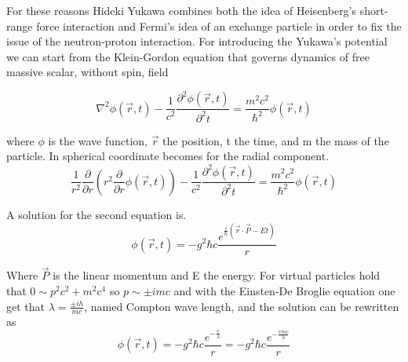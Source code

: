 \documentclass[12pt,a4paper]{book}
\begin{document}
	For these reasons Hideki Yukawa combines both the idea of Heisenberg's short-range force interaction and Fermi's idea of an exchange particle in order to fix the issue of the neutron-proton interaction. For introducing the Yukawa's potential we can start from the Klein-Gordon equation that governs dynamics of free massive scalar, without spin, field
	
	\begin{equation}
		\nabla^2 \phi(\vec{r},t) - \frac{1}{c^2} \frac{\partial^2 \phi(\vec{r},t)}{\partial^2 t} = \frac{m^2 c^2}{\hbar^2} \phi(\vec{r},t)
		\label{eq:klein-gordon}
	\end{equation}
	
	where $\phi$ is the wave function, $\vec{r}$ the position, t the time, and m the mass of the particle. In spherical coordinate becomes for the radial component.
	\begin{equation}
		\frac{1}{r^2} \frac{\partial}{\partial r} (r^2 \frac{\partial}{\partial r} \phi(\vec{r},t)) - \frac{1}{c^2} \frac{\partial^2 \phi(\vec{r},t)}{\partial^2 t} = \frac{m^2 c^2}{\hbar^2} \phi(\vec{r},t)
		\label{eq:klein-gordon-spjericaò}
	\end{equation}
	
	A solution for the second equation is.
	\begin{equation}
		\phi(\vec{r},t)= - g^2 \hbar c \frac{e^{\frac{i}{\hbar}(\vec{r} \cdot \vec{P}- E t)}}{r} 
		\label{eq:klein-gordon-sol}
	\end{equation}
	
	Where $\vec{P}$ is the linear momentum and E the energy. For virtual particles hold that $0 \sim p^2 c^2 + m^2 c^4$ so $p\sim \pm i m c$ and with the Einsten-De Broglie equation one get that $\lambda = \frac{\pm ih}{mc}$, named Compton wave length, and the solution can be rewritten as
	\begin{equation}
		\phi(\vec{r},t)= - g^2 \hbar c \frac{e^{-\frac{r}{\lambda}}}{r} = - g^2 \hbar c \frac{e^{-\frac{r mc}{h}}}{r}
		\label{eq:klein-gordon-final-sol}
	\end{equation}
	
\end{document}
